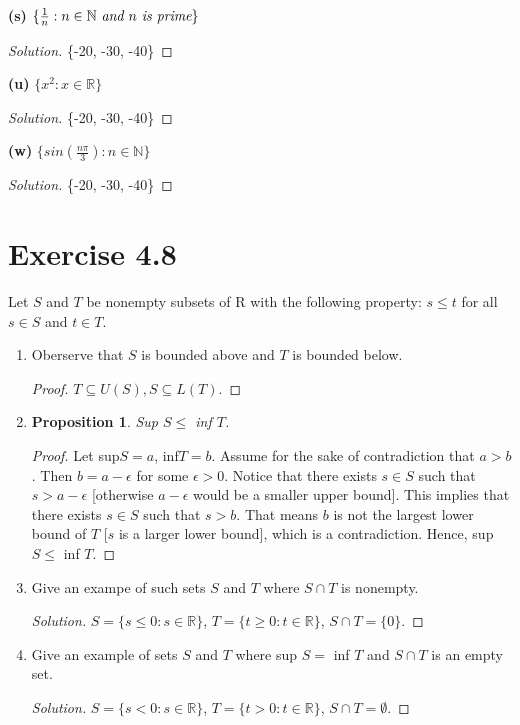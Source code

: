 \documentclass{article}
\newtheorem{proposition}[thm]{Proposition}
\begin{document}
\textbf{(s)} $\{\frac{1}{n}:n\in\mathbb{N} \emph{ and } n \emph{ is prime}\}$
\begin{proof}[Solution]
    \{-20, -30, -40\}
\end{proof}

\textbf{(u)} $\{x^2:x\in\mathbb{R}\}$
\begin{proof}[Solution]
    \{-20, -30, -40\}
\end{proof}

\textbf{(w)} $\{sin\left(\frac{n\pi}{3}\right):n\in\mathbb{N}\}$
\begin{proof}[Solution]
    \{-20, -30, -40\}
\end{proof}

\section*{Exercise 4.8}
Let $S$ and $T$ be nonempty subsets of R with the following property: $s\le t$ for all $s\in S$ and 
$t\in T$.
\begin{enumerate}[label=(\alph*)]
    \item Oberserve that $S$ is bounded above and $T$ is bounded below. 
    \begin{proof}
        $T\subseteq U(S), S\subseteq L(T)$.
    \end{proof}
    \item \begin{proposition}
        Sup $S\le$ inf $T$.
    \end{proposition}
    \begin{proof}
        Let sup$S = a$, inf$T = b$. Assume for the sake of contradiction that $a > b$. Then $b = 
        a - \epsilon$ for some $\epsilon > 0$. Notice that there exists $s\in S$ 
        such that $s > a - \epsilon$ [otherwise $a -\epsilon$ would be a 
        smaller upper bound]. This implies that there exists $s\in S$ such that $s > b$. That 
        means $b$ is not the largest lower bound of $T$ [$s$ is a larger lower bound], which is 
        a contradiction. Hence, sup $S\le$ inf $T$.
    \end{proof}
    \item Give an exampe of such sets $S$ and $T$ where $S\cap T$ is nonempty.
    \begin{proof}[Solution]
        $S = \{s \le 0 :s \in\mathbb{R}\}$, $T = \{t \ge 0 :t \in\mathbb{R}\}$, $S\cap T = \{0\}$.
    \end{proof}
    \item Give an example of sets $S$ and $T$ where sup $S=$ inf $T$ and $S\cap T$ is an empty set.
    \begin{proof}[Solution]
        $S = \{s < 0 :s \in\mathbb{R}\}$, $T = \{t > 0 :t \in\mathbb{R}\}$, $S\cap T = \emptyset$.
    \end{proof}
\end{enumerate}
\end{document}
